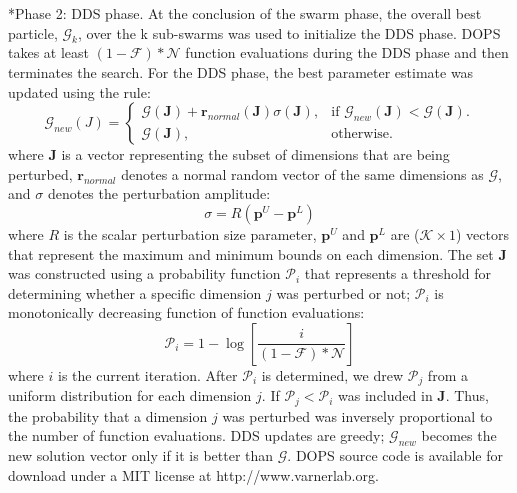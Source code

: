 \documentclass[12pt]{article}
\makeatletter
\renewcommand\subsubsection{\@startsection
	{subsubsection}{2}{0mm}
	{-0.05in}
	{-0.5\baselineskip}
	{\normalfont\normalsize\itshape}}
\makeatother
\begin{document}
\subsubsection*{Phase 2: DDS phase.}
At the conclusion of the swarm phase, the overall best particle, $\mathcal{G}_{k}$, over the k sub-swarms was used to initialize the DDS phase.
DOPS takes at least $\left(1-\mathcal{F}\right)*\mathcal{N}$ function evaluations during the DDS phase and then terminates the search.
For the DDS phase, the best parameter estimate was updated using the rule:
\begin{equation}
  \mathcal{G}_{new}({J})=\begin{cases}
    \mathcal{G}(\mathbf{J})+\mathbf{r}_{normal}(\mathbf{J})\sigma(\mathbf{J}), & \text{if $\mathcal{G}_{new}(\mathbf{J})<\mathcal{G}(\mathbf{J})$}.\\
    \mathcal{G}(\mathbf{J}), & \text{otherwise}.
  \end{cases}
\end{equation}
where $\mathbf{J}$ is a vector representing the subset of dimensions that are being perturbed, $\mathbf{r}_{normal}$ denotes a normal random vector of the same dimensions as $\mathcal{G}$,
and $\sigma$ denotes the perturbation amplitude:
\begin{equation}
	\sigma = {R}(\mathbf{p}^U - \mathbf{p}^L)
\end{equation}
where ${R}$ is the scalar perturbation size parameter, $\mathbf{p}^U$ and $\mathbf{p}^L$ are ($\mathcal{K}\times{1}$) vectors that represent the maximum and minimum bounds on each dimension. The set $\mathbf{J}$ was constructed using a probability function $\mathcal{P}_{i}$ that represents a threshold for determining whether a specific dimension $j$ was perturbed or not; $\mathcal{P}_{i}$ is monotonically decreasing function of function evaluations:
\begin{equation}
	\mathcal{P}_{i}={1}-\log\left[\frac{i}{(1-\mathcal{F})*\mathcal{N}}\right]
\end{equation}
where $i$ is the current iteration. After $\mathcal{P}_{i}$ is determined, we drew $\mathcal{P}_{j}$ from a uniform distribution for each dimension $j$.
If $\mathcal{P}_{j}<\mathcal{P}_{i}$ was included in \textbf{J}.
Thus, the probability that a dimension $j$ was perturbed was inversely proportional to the number of function evaluations.
DDS updates are greedy; $\mathcal{G}_{new}$ becomes the new solution vector only if it is better than $\mathcal{G}$.
DOPS source code is available for download under a MIT license at http://www.varnerlab.org.
\end{document}
